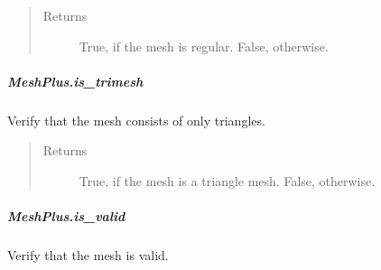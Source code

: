 \documentclass[letterpaper,10pt,english]{sphinxmanual}
\begin{document}
\begin{fulllineitems}
\begin{fulllineitems}
\begin{itemize}
\end{itemize}
\begin{quote}\begin{description}
\item[{Returns}] \leavevmode
{} \textendash{} True, if the mesh is regular.
False, otherwise.

\end{description}\end{quote}

\end{fulllineitems}



\subparagraph{MeshPlus.is\_trimesh}
\label{\detokenize{api/generated/directional_clustering.mesh.MeshPlus.is_trimesh:meshplus-is-trimesh}}\label{\detokenize{api/generated/directional_clustering.mesh.MeshPlus.is_trimesh::doc}}

\begin{fulllineitems}
\label{\detokenize{api/generated/directional_clustering.mesh.MeshPlus.is_trimesh:directional_clustering.mesh.MeshPlus.is_trimesh}}
Verify that the mesh consists of only triangles.
\begin{quote}\begin{description}
\item[{Returns}] \leavevmode
{} \textendash{} True, if the mesh is a triangle mesh.
False, otherwise.

\end{description}\end{quote}

\end{fulllineitems}



\subparagraph{MeshPlus.is\_valid}
\label{\detokenize{api/generated/directional_clustering.mesh.MeshPlus.is_valid:meshplus-is-valid}}\label{\detokenize{api/generated/directional_clustering.mesh.MeshPlus.is_valid::doc}}

\begin{fulllineitems}
\label{\detokenize{api/generated/directional_clustering.mesh.MeshPlus.is_valid:directional_clustering.mesh.MeshPlus.is_valid}}
Verify that the mesh is valid.


\end{fulllineitems}
\end{fulllineitems}
\end{document}

